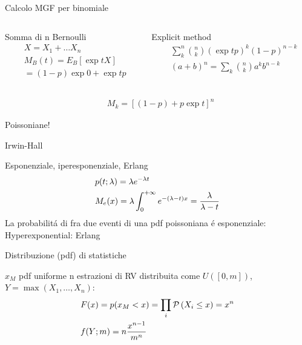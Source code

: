 \begin{wordonframe}{Calcolo MGF per binomiale}
\begin{columns}[T]
\begin{column}{0.5\textwidth}
\begin{block}{Somma di n Bernoulli}
\begin{align*}
&X=X_1+\ldots X_n\\
&M_B(t)=E_B[\exp{tX}]\\
&=(1-p)\exp{0}+\exp{t}p
\end{align*}
\end{block}
\end{column}
\begin{column}{0.5\textwidth}
\begin{block}{Explicit method}
\begin{align*}
&\sum_k^n\binom{n}{k}(\exp{t}p)^k(1-p)^{n-k}\\
&(a+b)^n=\sum_k\binom{n}{k}a^kb^{n-k}
\end{align*}
\end{block}
\end{column}
\end{columns}
\begin{align*}
&M_k=[(1-p)+p\exp{t}]^n
\end{align*}
\end{wordonframe}

\begin{wordonframe}{Poissoniane!}

\end{wordonframe}

\begin{frame}{Irwin-Hall}
    
\end{frame}

\begin{frame}{Esponenziale, iperesponenziale, Erlang}
\begin{align*}
&p(t;\lambda)=\lambda e^{-\lambda t}\\
&M_e(x)=\lambda\int_{0}^{+\infty}{}e^{-(\lambda-t)x}=\frac{\lambda}{\lambda-t}
\end{align*}
La probabilit\'a di fra due eventi di una pdf poissoniana \'e esponenziale: 
Hyperexponential:
Erlang
\end{frame}

\begin{frame}{Distribuzione (pdf) di statistiche}
\begin{block}{$x_M$ pdf uniforme}
n estrazioni di RV distribuita come $U([0,m])$, $Y=\max{(X_1,\ldots,X_n)}$:
\begin{align*}
&F(x)=p(x_M<x)=\prod_i\operatorname{\mathcal{P}}{(X_i\leq x)}=x^n\\
&f(Y;m)=n\frac{x^{n-1}}{m^n}
\end{align*}
\end{block}
\end{frame}


